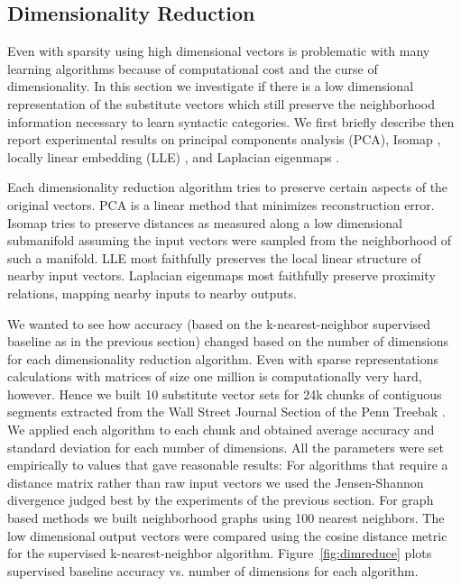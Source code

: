 \subsection{Dimensionality Reduction}
\label{sec:dimreduce}

Even with sparsity using high dimensional vectors is problematic with
many learning algorithms because of computational cost and the curse
of dimensionality.  In this section we investigate if there is a low
dimensional representation of the substitute vectors which still
preserve the neighborhood information necessary to learn syntactic
categories.  We first briefly describe then report experimental
results on principal components analysis (PCA), Isomap
\cite{tenenbaum2000global}, locally linear embedding (LLE)
\cite{roweis2000nonlinear}, and Laplacian eigenmaps
\cite{belkin2003laplacian}.

Each dimensionality reduction algorithm tries to preserve certain
aspects of the original vectors.  PCA is a linear method that
minimizes reconstruction error.  Isomap tries to preserve distances as
measured along a low dimensional submanifold assuming the input
vectors were sampled from the neighborhood of such a manifold.  LLE
most faithfully preserves the local linear structure of nearby input
vectors.  Laplacian eigenmaps most faithfully preserve proximity
relations, mapping nearby inputs to nearby outputs.

We wanted to see how accuracy (based on the k-nearest-neighbor
supervised baseline as in the previous section) changed based on the
number of dimensions for each dimensionality reduction algorithm.  
%
Even with sparse representations calculations with matrices of size
one million is computationally very hard, however.  Hence we built 10
substitute vector sets for 24k chunks of contiguous segments extracted
from the Wall Street Journal Section of the Penn Treebak
\cite{treebank3}.  We applied each algorithm to each chunk and
obtained average accuracy and standard deviation for each number of
dimensions.
%
All the parameters were set empirically to values that gave
reasonable results: For algorithms that require a distance matrix
rather than raw input vectors we used the Jensen-Shannon divergence
judged best by the experiments of the previous section.  For graph
based methods we built neighborhood graphs using 100 nearest
neighbors.  The low dimensional output vectors were compared using the
cosine distance metric for the supervised k-nearest-neighbor
algorithm.  Figure~\ref{fig:dimreduce} plots supervised baseline
accuracy vs. number of dimensions for each algorithm.


